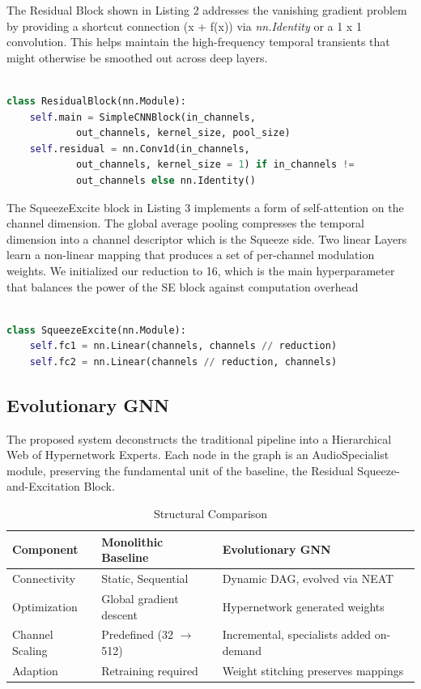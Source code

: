 \documentclass{article}
\begin{document}
\noindent The Residual Block shown in Listing 2 addresses the vanishing gradient problem by providing a shortcut connection (x + f(x)) via \textit{nn.Identity} or a 1 x 1 convolution. This helps maintain the high-frequency temporal transients that might otherwise be smoothed out across deep layers.

\begin{lstlisting}[language=Python,  caption= Residual Block]

class ResidualBlock(nn.Module):
	self.main = SimpleCNNBlock(in_channels, 
            out_channels, kernel_size, pool_size)
	self.residual = nn.Conv1d(in_channels, 
            out_channels, kernel_size = 1) if in_channels != 
            out_channels else nn.Identity()
\end{lstlisting}


\noindent The SqueezeExcite block in Listing 3 implements a form of self-attention on the channel dimension. The global average pooling compresses the temporal dimension into a channel descriptor which is the Squeeze side. Two linear Layers learn a non-linear mapping that produces a set of per-channel modulation weights. We initialized our reduction to 16, which is the main hyperparameter that balances the power of the SE block against computation overhead

\begin{lstlisting}[language=Python,  caption= Squeeze-and-Excitation Block]

class SqueezeExcite(nn.Module):
	self.fc1 = nn.Linear(channels, channels // reduction)
	self.fc2 = nn.Linear(channels // reduction, channels)
\end{lstlisting}


\subsection{Evolutionary GNN}
The proposed system deconstructs the traditional pipeline into a Hierarchical Web of Hypernetwork Experts. Each node in the graph is an AudioSpecialist module, preserving the fundamental unit of the baseline, the Residual Squeeze-and-Excitation Block.

\begin{table}[ht]
\caption{Structural Comparison}
\label{table:nonlin}
\centering
\footnotesize %
\begin{tabular}{lp{3.5cm}p{4cm}} %
\toprule
\textbf{Component} & \textbf{Monolithic Baseline} & \textbf{Evolutionary GNN} \\ 
\midrule
Connectivity    & Static, Sequential            & Dynamic DAG, evolved via NEAT \\
Optimization    & Global gradient descent       & Hypernetwork generated weights \\
Channel Scaling & Predefined (32 $\to$ 512)     & Incremental, specialists added on-demand \\
Adaption        & Retraining required           & Weight stitching preserves mappings \\ 
\bottomrule
\end{tabular}
\end{table}
\end{document}
